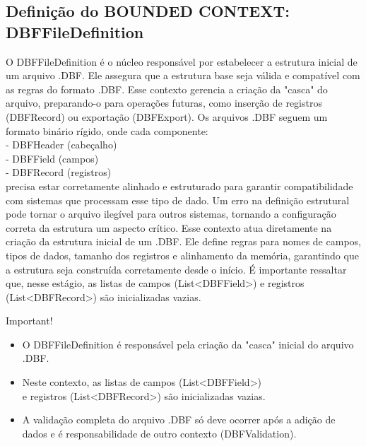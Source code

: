 \subsection{Definição do BOUNDED CONTEXT: DBFFileDefinition}
O DBFFileDefinition é o núcleo responsável por estabelecer a estrutura inicial de um arquivo .DBF. Ele assegura que a estrutura base seja válida e compatível com as regras do formato .DBF. Esse contexto gerencia a criação da "casca" do arquivo, preparando-o para operações futuras, como inserção de registros (DBFRecord) ou exportação (DBFExport).
Os arquivos .DBF seguem um formato binário rígido, onde cada componente: \\
 - DBFHeader (cabeçalho) \\
 - DBFField (campos) \\
 - DBFRecord (registros) \\
precisa estar corretamente alinhado e estruturado para garantir compatibilidade com sistemas que processam esse tipo de dado. Um erro na definição estrutural pode tornar o arquivo ilegível para outros sistemas, tornando a configuração correta da estrutura um aspecto crítico.
Esse contexto atua diretamente na criação da estrutura inicial de um .DBF. Ele define regras para nomes de campos, tipos de dados, tamanho dos registros e alinhamento da memória, garantindo que a estrutura seja construída corretamente desde o início. É importante ressaltar que, nesse estágio, as listas de campos (List<DBFField>) e registros (List<DBFRecord>) são inicializadas vazias. \\

\begin{bclogo}[logo=\bcattention, couleurBarre=red, noborder=true, 
    couleur=LightSalmon]{Important!}
    \begin{itemize}
        \item O DBFFileDefinition é responsável pela criação da "casca" inicial do arquivo .DBF.
        \item Neste contexto, as listas de campos (List<DBFField>) \\ e registros (List<DBFRecord>) são inicializadas vazias.
        \item A validação completa do arquivo .DBF só deve ocorrer após a adição de dados e é responsabilidade de outro contexto (DBFValidation).
    \end{itemize}
\end{bclogo}

